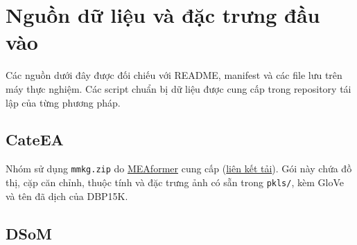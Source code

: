 \appendices
\section{Nguồn dữ liệu và đặc trưng đầu vào}
\label{app:data_sources}

Các nguồn dưới đây được đối chiếu với README, manifest và
các file lưu trên máy thực nghiệm. Các script chuẩn bị dữ
liệu được cung cấp trong repository tái lập của từng phương
pháp.

\subsection{CateEA}

Nhóm sử dụng \texttt{mmkg.zip} do
\href{https://github.com/zjukg/MEAformer}{MEAformer} cung cấp
(\href{https://drive.google.com/file/d/1VIWcc3KDcLcRImeSrF2AyhetBLq_gsnx/view}{liên kết tải}).
Gói này chứa đồ thị, cặp căn chỉnh, thuộc tính và đặc trưng
ảnh có sẵn trong \texttt{pkls/}, kèm GloVe và tên đã dịch
của DBP15K.

\subsection{DSoM}

